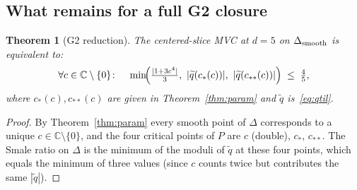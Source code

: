 \documentclass[11pt,a4paper]{article}
\newtheorem{theorem}{Theorem}[section]
\begin{document}
\subsection{What remains for a full G2 closure}

\begin{theorem}[G2 reduction]\label{thm:G2-reduction}
The centered-slice MVC at $d=5$ on $\Delta_{\rm smooth}$ is equivalent to:
\begin{equation}
\forall c\in\mathbb{C}\setminus\{0\}\colon\quad
\min\!\Bigl(\tfrac{|1+3c^4|}{3},\ |\widetilde q(c_*(c))|,\ |\widetilde q(c_{**}(c))|\Bigr)\;\le\;\tfrac{4}{5},
\label{eq:G2-reduction}
\end{equation}
where $c_*(c),c_{**}(c)$ are given in Theorem~\ref{thm:param} and
$\widetilde q$ is~\eqref{eq:qtil}.
\end{theorem}

\begin{proof}
By Theorem~\ref{thm:param} every smooth point of $\Delta$ corresponds
to a unique $c\in\mathbb{C}\setminus\{0\}$, and the four critical points
of $P$ are $c$ (double), $c_*$, $c_{**}$. The Smale ratio on $\Delta$
is the minimum of the moduli of $\widetilde q$ at these four points,
which equals the minimum of three values (since $c$ counts twice but
contributes the same $|\widetilde q|$).
\end{proof}
\end{document}

